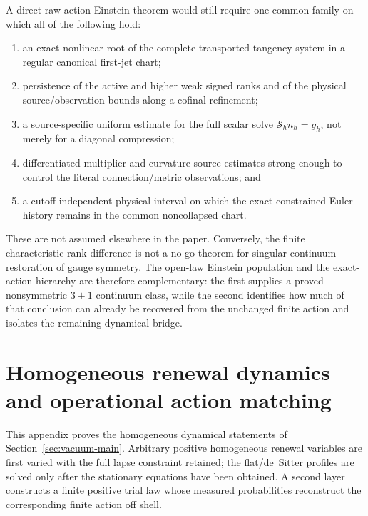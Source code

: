 \documentclass[11pt]{article}
\theoremstyle{definition}
\theoremstyle{remark}
\begin{document}
A direct raw-action Einstein theorem would still require one common family on
which all of the following hold:
\begin{enumerate}[label=\textup{(R\arabic*)},leftmargin=3em]
\item an exact nonlinear root of the complete transported tangency system in a
      regular canonical first-jet chart;
\item persistence of the active and higher weak signed ranks and of the
      physical source/observation bounds along a cofinal refinement;
\item a source-specific uniform estimate for the full scalar solve
      $\mathscr S_hn_h=g_h$, not merely for a diagonal compression;
\item differentiated multiplier and curvature-source estimates strong enough
      to control the literal connection/metric observations; and
\item a cutoff-independent physical interval on which the exact constrained
      Euler history remains in the common noncollapsed chart.
\end{enumerate}
These are not assumed elsewhere in the paper.  Conversely, the finite
characteristic-rank difference is not a no-go theorem for singular continuum
restoration of gauge symmetry.  The open-law Einstein population and the
exact-action hierarchy are therefore complementary: the first supplies a
proved nonsymmetric $3+1$ continuum class, while the second identifies how
much of that conclusion can already be recovered from the unchanged finite
action and isolates the remaining dynamical bridge.

\section{Homogeneous renewal dynamics and operational action matching}
\label{supp:homogeneous-dynamics}

This appendix proves the homogeneous dynamical statements of
Section~\ref{sec:vacuum-main}.  Arbitrary positive homogeneous renewal variables
are first varied with the full lapse constraint retained; the flat/de~Sitter
profiles are solved only after the stationary equations have been obtained.  A second layer constructs a finite positive
trial law whose measured probabilities reconstruct the corresponding finite
action off shell.
\end{document}
